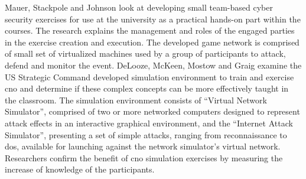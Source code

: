 Mauer, Stackpole and Johnson \cite{Mauer2012} look at developing small team-based cyber security exercises for use at the university as a practical hands-on part within the courses. The research explains the management and roles of the engaged parties in the exercise creation and execution. The developed game network is comprised of small set of virtualized machines used by a group of participants to attack, defend and monitor the event.
DeLooze, McKeen, Mostow and Graig \cite{DeLooze2004} examine the US Strategic Command developed simulation environment to train and exercise \gls{cno} and determine if these complex concepts can be more effectively taught in the classroom. The simulation environment consists of ``Virtual Network Simulator'', comprised of two or more networked computers designed to represent attack effects in an interactive graphical environment, and the ``Internet Attack Simulator'', presenting a set of simple attacks, ranging from reconnaissance to \gls{dos}, available for launching against the network simulator's virtual network. Researchers confirm the benefit of \gls{cno} simulation exercises by measuring the increase of knowledge of the participants.